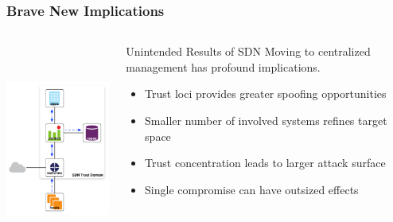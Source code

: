 \documentclass[t,handout]{beamer}
\begin{document}
\begin{frame}
\frametitle{Brave New Implications}
\begin{columns}[T]
\includegraphics[height=2.75in]{reference-model}
\begin{beamerboxesrounded}[shadow]{Unintended Results of SDN}
Moving to centralized management has profound implications.
\begin{itemize}
\item Trust loci provides greater spoofing opportunities
\item Smaller number of involved systems refines target space
\item Trust concentration leads to larger attack surface
\item Single compromise can have outsized effects
\end{itemize}
\end{beamerboxesrounded}
\end{columns}
\end{frame}
\end{document}
